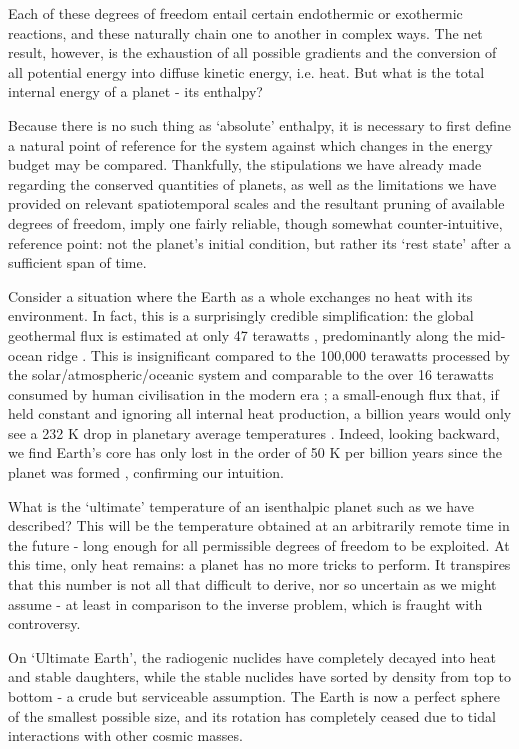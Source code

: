 \documentclass[a4paper,11pt,oneside]{book}
\begin{document}
Each of these degrees of freedom entail certain endothermic or exothermic reactions, and these naturally chain one to another in complex ways. The net result, however, is the exhaustion of all possible gradients and the conversion of all potential energy into diffuse kinetic energy, i.e. heat. But what is the total internal energy of a planet - its enthalpy?

Because there is no such thing as `absolute' enthalpy, it is necessary to first define a natural point of reference for the system against which changes in the energy budget may be compared. Thankfully, the stipulations we have already made regarding the conserved quantities of planets, as well as the limitations we have provided on relevant spatiotemporal scales and the resultant pruning of available degrees of freedom, imply one fairly reliable, though somewhat counter-intuitive, reference point: not the planet's initial condition, but rather its `rest state' after a sufficient span of time.

Consider a situation where the Earth as a whole exchanges no heat with its environment. In fact, this is a surprisingly credible simplification: the global geothermal flux is estimated at only 47 terawatts \citet{Lay2008-lm, Davies2010-gz}, predominantly along the mid-ocean ridge \cite{Davies2013-ty}. This is insignificant compared to the 100,000 terawatts processed by the solar/atmospheric/oceanic system and comparable to the over 16 terawatts consumed by human civilisation in the modern era \cite{Iea2007-pd}; a small-enough flux that, if held constant and ignoring all internal heat production, a billion years would only see a 232 K drop in planetary average temperatures \cite{Sleep2000-wa}. Indeed, looking backward, we find Earth's core has only lost in the order of 50 K per billion years since the planet was formed \cite{Verhoogen1980-rh}, confirming our intuition.

What is the `ultimate' temperature of an isenthalpic planet such as we have described? This will be the temperature obtained at an arbitrarily remote time in the future - long enough for all permissible degrees of freedom to be exploited. At this time, only heat remains: a planet has no more tricks to perform. It transpires that this number is not all that difficult to derive, nor so uncertain as we might assume - at least in comparison to the inverse problem, which is fraught with controversy.

On `Ultimate Earth', the radiogenic nuclides have completely decayed into heat and stable daughters, while the stable nuclides have sorted by density from top to bottom - a crude but serviceable assumption. The Earth is now a perfect sphere of the smallest possible size, and its rotation has completely ceased due to tidal interactions with other cosmic masses.
\end{document}

